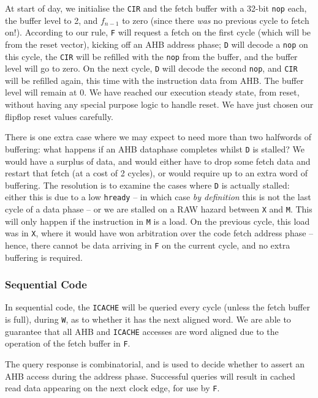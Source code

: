 \documentclass{article}
\begin{document}
At start of day, we initialise the \texttt{CIR} and the fetch buffer with a 32-bit \texttt{nop} each, the buffer level to 2, and $f_{n-1}$ to zero (since there \textit{was} no previous cycle to fetch on!). According to our rule, \texttt{F} will request a fetch on the first cycle (which will be from the reset vector), kicking off an AHB address phase; \texttt{D} will decode a \texttt{nop} on this cycle, the \texttt{CIR} will be refilled with the \texttt{nop} from the buffer, and the buffer level will go to zero. On the next cycle, \texttt{D} will decode the second \texttt{nop}, and \texttt{CIR} will be refilled again, this time with the instruction data from AHB. The buffer level will remain at 0. We have reached our execution steady state, from reset, without having any special purpose logic to handle reset. We have just chosen our flipflop reset values carefully.

There is one extra case where we may expect to need more than two halfwords of buffering: what happens if an AHB dataphase completes whilst \texttt{D} is stalled? We would have a surplus of data, and would either have to drop some fetch data and restart that fetch (at a cost of 2 cycles), or would require up to an extra word of buffering. The resolution is to examine the cases where \texttt{D} is actually stalled: either this is due to a low \texttt{hready} -- in which case \textit{by definition} this is not the last cycle of a data phase -- or we are stalled on a RAW hazard between \texttt{X} and \texttt{M}. This will only happen if the instruction in \texttt{M} is a load. On the previous cycle, this load was in \texttt{X}, where it would have won arbitration over the code fetch address phase -- hence, there cannot be data arriving in \texttt{F} on the current cycle, and no extra buffering is required.

\subsubsection{Sequential Code}

In sequential code, the \texttt{ICACHE} will be queried every cycle (unless the fetch buffer is full), during \texttt{W}, as to whether it has the next aligned word. We are able to guarantee that all AHB and \texttt{ICACHE} accesses are word aligned due to the operation of the fetch buffer in \texttt{F}.

The query response is combinatorial, and is used to decide whether to assert an AHB access during the address phase. Successful queries will result in cached read data appearing on the next clock edge, for use by \texttt{F}.
\end{document}
